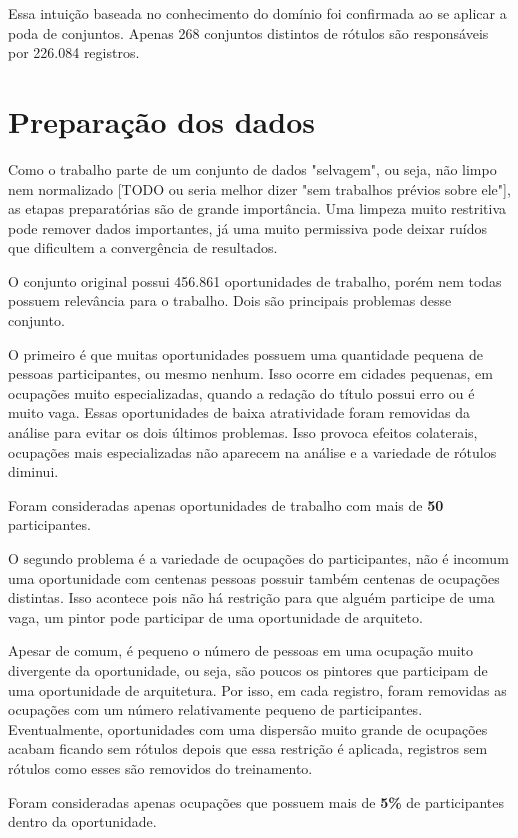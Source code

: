\documentclass[runningheads,a4paper]{llncs}
\begin{document}
Essa intuição baseada no conhecimento do domínio foi confirmada ao se aplicar a poda de conjuntos. Apenas 268 conjuntos distintos de rótulos são responsáveis por 226.084 registros.

\section{Preparação dos dados} \label{sec:preparacao}

Como o trabalho parte de um conjunto de dados "selvagem", ou seja, não limpo nem normalizado [TODO ou seria melhor dizer "sem trabalhos prévios sobre ele"], as etapas preparatórias são de grande importância. Uma limpeza muito restritiva pode remover dados importantes, já uma muito permissiva pode deixar ruídos que dificultem a convergência de resultados.

O conjunto original possui 456.861 oportunidades de trabalho, porém nem todas possuem relevância para o trabalho. Dois são principais problemas desse conjunto.

O primeiro é que muitas oportunidades possuem uma quantidade pequena de pessoas participantes, ou mesmo nenhum. Isso ocorre em cidades pequenas, em ocupações muito especializadas, quando a redação do título possui erro ou é muito vaga. Essas oportunidades de baixa atratividade foram removidas da análise para evitar os dois últimos problemas. Isso provoca efeitos colaterais, ocupações mais especializadas não aparecem na análise e a variedade de rótulos diminui.

Foram consideradas apenas oportunidades de trabalho com mais de \textbf{50} participantes.

O segundo problema é a variedade de ocupações do participantes, não é incomum uma oportunidade com centenas pessoas possuir também centenas de ocupações distintas. Isso acontece pois não há restrição para que alguém participe de uma vaga, um pintor pode participar de uma oportunidade de arquiteto.

Apesar de comum, é pequeno o número de pessoas em uma ocupação muito divergente da oportunidade, ou seja, são poucos os pintores que participam de uma oportunidade de arquitetura. Por isso, em cada registro, foram removidas as ocupações com um número relativamente pequeno de participantes. Eventualmente, oportunidades com uma dispersão muito grande de ocupações acabam ficando sem rótulos depois que essa restrição é aplicada, registros sem rótulos como esses são removidos do treinamento.

Foram consideradas apenas ocupações que possuem mais de \textbf{5\%} de participantes dentro da oportunidade.
\end{document}
